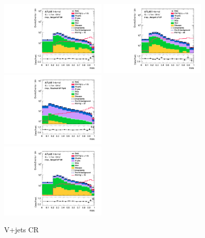 \begin{figure}[H]
    \centering
    \includegraphics[width=0.45\textwidth]{figures/PostFit/Region_distRNN_DSRVBSHP_BMin0_J0_incJet1_L0_T0_incFat1_Y6051_incTag1_Fat1_GlobalFit_unconditionnal_mu1log}
    \includegraphics[width=0.45\textwidth]{figures/PostFit/Region_distRNN_DSRVBSLP_BMin0_J0_incJet1_L0_T0_incFat1_Y6051_incTag1_Fat1_GlobalFit_unconditionnal_mu1log}
    \includegraphics[width=0.45\textwidth]{figures/PostFit/Region_distRNN_DSRVBSFid_BMin0_T0_Y6051_incTag1_J2_L0_incJet1_GlobalFit_unconditionnal_mu1log}
    \\
    \includegraphics[width=0.45\textwidth]{figures/PostFit/Region_distRNN_DSRVBSHP_BMin0_J0_incJet1_L0_T0_incFat1_Y6051_incTag1_Fat1_GlobalFit_unconditionnal_mu1log}
    \\
    \caption{V+jets CR}
    \label{fig:postCR}
\end{figure}

